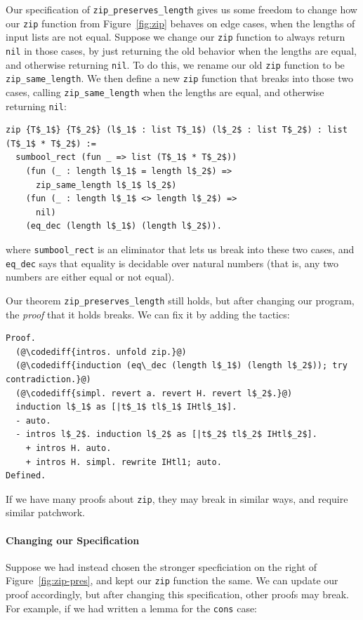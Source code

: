Our specification of \lstinline{zip_preserves_length} gives us some freedom to change how our \lstinline{zip} function from Figure~\ref{fig:zip} behaves on edge cases,
when the lengths of input lists are not equal.
Suppose we change our \lstinline{zip} function to always return \lstinline{nil} in those cases,
by just returning the old behavior when the lengths are equal, and otherwise returning \lstinline{nil}.
To do this, we rename our old \lstinline{zip} function to be \lstinline{zip_same_length}.
We then define a new \lstinline{zip} function that breaks into those two cases, calling \lstinline{zip_same_length}
when the lengths are equal, and otherwise returning \lstinline{nil}:

\begin{lstlisting}
zip {T$_1$} {T$_2$} (l$_1$ : list T$_1$) (l$_2$ : list T$_2$) : list (T$_1$ * T$_2$) :=
  sumbool_rect (fun _ => list (T$_1$ * T$_2$))
    (fun (_ : length l$_1$ = length l$_2$) =>
      zip_same_length l$_1$ l$_2$)
    (fun (_ : length l$_1$ <> length l$_2$) =>
      nil)
    (eq_dec (length l$_1$) (length l$_2$)).
\end{lstlisting}
where \lstinline{sumbool_rect} is an eliminator that lets us break into these two cases, and 
\lstinline{eq_dec} says that equality is decidable over natural numbers (that is, any two numbers are either equal or not equal).


Our theorem \lstinline{zip_preserves_length} still holds, but after changing our program, the \textit{proof} that it holds breaks.
We can fix it by adding the  tactics:

\begin{lstlisting}
Proof.
  (@\codediff{intros. unfold zip.}@)
  (@\codediff{induction (eq\_dec (length l$_1$) (length l$_2$)); try contradiction.}@)
  (@\codediff{simpl. revert a. revert H. revert l$_2$.}@)
  induction l$_1$ as [|t$_1$ tl$_1$ IHtl$_1$].
  - auto.
  - intros l$_2$. induction l$_2$ as [|t$_2$ tl$_2$ IHtl$_2$].
    + intros H. auto.
    + intros H. simpl. rewrite IHtl1; auto.
Defined.
\end{lstlisting}
If we have many proofs about \lstinline{zip}, they may break in similar ways, and require similar patchwork.

\paragraph{Changing our Specification}
Suppose we had instead chosen the stronger specficiation on the right of Figure~\ref{fig:zip-pres},
and kept our \lstinline{zip} function the same.
We can update our proof accordingly, but after changing this specification, other proofs may break.
For example, if we had written a lemma for the \lstinline{cons} case:


